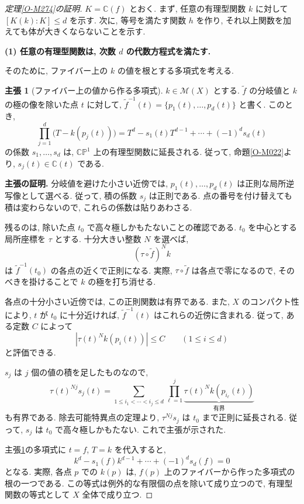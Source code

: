 \documentclass[dvipdfmx,a4paper,11pt]{article} %
\newcommand{\C}{\mathbb{C}}
\theoremstyle{definition}
\numberwithin{equation}{section}
\newtheorem{claim}[thm]{主張}
\begin{document}
\begin{proof}[定理\ref{O-M274}の証明]
$K=\C(f)$ とおく.
まず, 任意の有理型関数 $k$ に対して $[K(k):K]\leq d$ を示す.
次に, 等号を満たす関数 $h$ を作り,
それ以上関数を加えても体が大きくならないことを示す.

\medskip
\noindent
\textbf{(1) 任意の有理型関数は, 次数 $d$ の代数方程式を満たす.}

そのために, ファイバー上の $k$ の値を根とする多項式を考える.

\begin{claim}[ファイバー上の値から作る多項式]\label{O-M275}
$k\in\mathcal M(X)$ とする.
$\widetilde f$ の分岐値と $k$ の極の像を除いた点 $t$ に対して,
$\widetilde f^{-1}(t)=\{p_1(t),\ldots,p_d(t)\}$ と書く.
このとき,
\begin{equation}\label{O-EQ070}
\prod_{j=1}^d\bigl(T-k(p_j(t))\bigr)
=T^d-s_1(t)T^{d-1}+\cdots+(-1)^d s_d(t)
\end{equation}
の係数 $s_1,\ldots,s_d$ は,
$\C\mathbb P^1$ 上の有理型関数に延長される.
従って, 命題\ref{O-M022}より, $s_j(t)\in\C(t)$ である.
\end{claim}

\smallskip
\noindent
\textbf{主張の証明.}
分岐値を避けた小さい近傍では,
$p_1(t),\ldots,p_d(t)$ は正則な局所逆写像として選べる.
従って, 積の係数 $s_j$ は正則である.
点の番号を付け替えても積は変わらないので,
これらの係数は貼りあわさる.

残るのは, 除いた点 $t_0$ で高々極しかもたないことの確認である.
$t_0$ を中心とする局所座標を $\tau$ とする.
十分大きい整数 $N$ を選べば,
\[
(\tau\circ\widetilde f)^N k
\]
は $\widetilde f^{-1}(t_0)$ の各点の近くで正則になる.
実際, $\tau\circ\widetilde f$ は各点で零になるので,
そのべきを掛けることで $k$ の極を打ち消せる.

各点の十分小さい近傍では, この正則関数は有界である.
また, $X$ のコンパクト性により,
$t$ が $t_0$ に十分近ければ,
$\widetilde f^{-1}(t)$ はこれらの近傍に含まれる.
従って, ある定数 $C$ によって
\[
|\tau(t)^N k(p_i(t))|\leq C
\qquad(1\leq i\leq d)
\]
と評価できる.

$s_j$ は $j$ 個の値の積を足したものなので,
\[
\tau(t)^{Nj}s_j(t)
=
\sum_{1\leq i_1<\cdots<i_j\leq d}
\prod_{\ell=1}^j
\underbrace{\tau(t)^N k(p_{i_\ell}(t))}_{\text{有界}}
\]
も有界である.
除去可能特異点の定理より,
$\tau^{Nj}s_j$ は $t_0$ まで正則に延長される.
従って, $s_j$ は $t_0$ で高々極しかもたない.
これで主張が示された.

\medskip
主張\ref{O-M275}の多項式に $t=f$, $T=k$ を代入すると,
\begin{equation}\label{O-EQ071}
k^d-s_1(f)k^{d-1}+\cdots+(-1)^d s_d(f)=0
\end{equation}
となる.
実際, 各点 $p$ での $k(p)$ は,
$f(p)$ 上のファイバーから作った多項式の根の一つである.
この等式は例外的な有限個の点を除いて成り立つので,
有理型関数の等式として $X$ 全体で成り立つ.


\end{proof}
\end{document}
